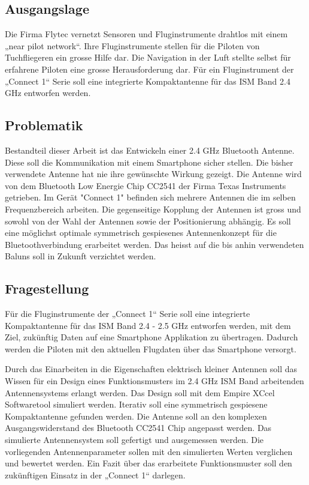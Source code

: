 \subsection{Ausgangslage}
Die Firma Flytec vernetzt Sensoren und Fluginstrumente drahtlos mit einem  „near pilot network“. Ihre Fluginstrumente stellen für die Piloten von Tuchfliegeren ein grosse Hilfe dar. Die Navigation in der Luft stellte selbst für erfahrene Piloten eine grosse Herausforderung dar. Für ein Fluginstrument der „Connect 1“ Serie  soll eine integrierte Kompaktantenne für das ISM Band 2.4 GHz entworfen werden. 

\subsection{Problematik}
Bestandteil dieser Arbeit ist das Entwickeln einer 2.4 GHz Bluetooth Antenne. Diese soll die Kommunikation mit einem Smartphone sicher stellen. Die bisher verwendete Antenne hat nie ihre gewünschte Wirkung gezeigt. Die Antenne wird von dem Bluetooth Low Energie Chip CC2541 der Firma Texas Instruments getrieben. Im Gerät "Connect 1" befinden sich mehrere Antennen die im selben Frequenzbereich arbeiten. Die gegenseitige Kopplung der Antennen ist gross und sowohl  von der Wahl der Antennen sowie der Positionierung abhängig. Es soll eine möglichst optimale symmetrisch gespiesenes Antennenkonzept für die Bluetoothverbindung erarbeitet werden. Das heisst auf die bis anhin verwendeten Baluns soll in Zukunft verzichtet werden.
\subsection{Fragestellung}
Für die Fluginstrumente der „Connect 1“ Serie  soll eine integrierte Kompaktantenne für das ISM Band 2.4 - 2.5 GHz entworfen werden, mit dem Ziel, zukünftig Daten auf eine Smartphone Applikation zu übertragen. Dadurch werden die Piloten mit den aktuellen Flugdaten über das Smartphone  versorgt. 

Durch das Einarbeiten in die Eigenschaften elektrisch kleiner Antennen soll das Wissen für ein Design eines Funktionsmusters  im 2.4 GHz ISM Band arbeitenden Antennensystems erlangt werden. Das Design soll mit dem Empire XCcel Softwaretool simuliert werden. Iterativ soll eine symmetrisch gespiesene Kompaktantenne gefunden werden. Die Antenne soll an den komplexen Ausgangswiderstand des Bluetooth CC2541 Chip angepasst werden. Das simulierte Antennensystem soll gefertigt und ausgemessen werden. Die vorliegenden Antennenparameter sollen mit den simulierten Werten verglichen und bewertet werden. Ein Fazit über das erarbeitete Funktionsmuster soll den zukünftigen Einsatz in der „Connect 1“ darlegen.
